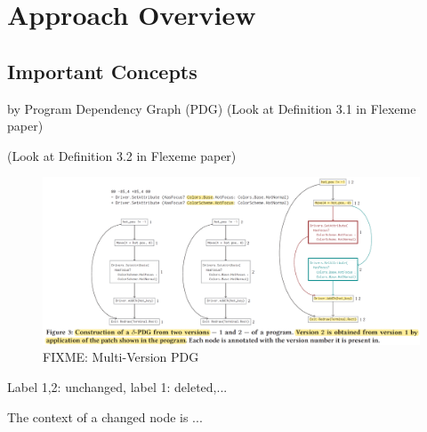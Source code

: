 \section{Approach Overview}
\label{overview:sec}

\subsection{Important Concepts}
\label{concepts:sec}

\begin{Definition}
  by Program Dependency Graph (PDG)
  (Look at Definition 3.1 in Flexeme paper)
\end{Definition}

\begin{Definition}
(Look at Definition 3.2 in Flexeme paper)
\end{Definition}

\begin{figure}[t]
	\centering
        \includegraphics[width=5.3in]{figures/multi-version-graph.png}
        \vspace{-6pt}
	\caption{FIXME: Multi-Version PDG}
	\label{fig:pdg}
\end{figure}

\begin{Definition}
Label 1,2: unchanged, label 1: deleted,...
\end{Definition}


\begin{Definition}[Context]
The context of a changed node is ...
\end{Definition}

